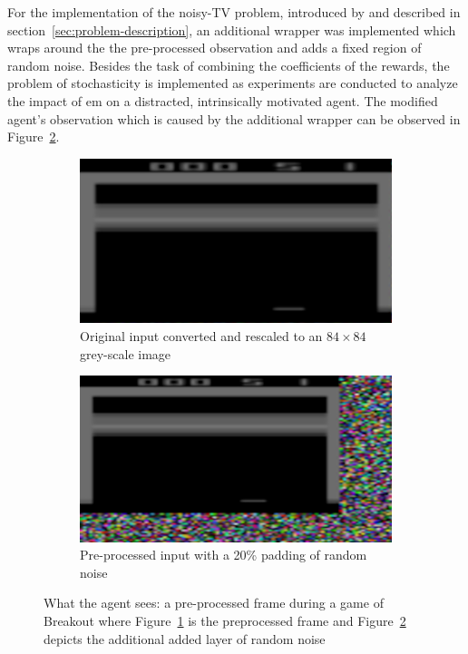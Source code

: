 \documentclass[draft,final]{vutinfth} %
\begin{document}
    For the implementation of the noisy-TV problem, introduced by \citeauthor{schmidhuber_formal_2010} and described in section~\ref{sec:problem-description}, an additional wrapper was implemented which wraps around the the pre-processed observation and adds a fixed region of random noise.
    Besides the task of combining the coefficients of the rewards, the problem of stochasticity is implemented as experiments are conducted to analyze the impact of \gls{em} on a distracted, intrinsically motivated agent.
    The modified agent's observation which is caused by the additional wrapper can be observed in Figure~\ref{fig:tv_noise}.

    \begin{figure}[h]
        \centering
        \begin{subfigure}{.40\textwidth}
            \centering
            \includegraphics[width=.9\linewidth]{figures/TV.PNG}
            \caption{Original input converted and rescaled to an $84 \times 84$ grey-scale image}
            \label{fig:tv}
        \end{subfigure}%
        \hspace{0.05\textwidth}
        \begin{subfigure}{.40\textwidth}
            \centering
            \includegraphics[width=.9\linewidth]{figures/TV_noise.PNG}
            \caption{Pre-processed input with a 20\% padding of random noise}
            \label{fig:tv_noise}
        \end{subfigure}
        \caption[What the agent sees: a pre-processed frame during a game of Breakout]{What the agent sees: a pre-processed frame during a game of Breakout where Figure~\ref{fig:tv} is the preprocessed frame and Figure~\ref{fig:tv_noise} depicts the additional added layer of random noise}
        \label{fig:observation}
    \end{figure}
\end{document}
